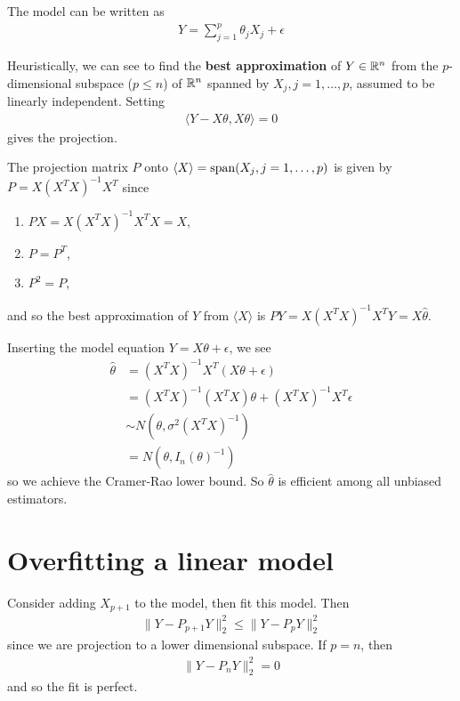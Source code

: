 \begin{proposition}
  The model can be written as
  \begin{align}
    \label{eq:100}
    Y = \sum_{j=1}^{p} \theta_{j} X_{j} + \epsilon
  \end{align}

  Heuristically, we can see to find the \textbf{best approximation} of
  $Y \in \mathbb{R}^{n}$ from the $p$-dimensional subspace ($p \leq n$) of
  $\mathbb{R}^{n}$ spanned by $X_{j}, j = 1, \dots, p$, assumed to be linearly
  independent.  Setting
  \begin{align}
    \label{eq:100}
    \langle Y - X \theta, X\theta \rangle = 0
  \end{align} gives the projection.

  The projection matrix $P$ onto $\langle X \rangle = \operatorname*{span} (X_{j}, j
  = 1, \dots, p)$ is given by $P = X (X^{T} X)^{-1} X^{T}$ since
  \begin{enumerate}
  \item $PX = X (X^{T} X)^{-1} X^{T} X = X$,
  \item $P = P^{T}$,
  \item $P^{2} = P$,
  \end{enumerate} and so the best approximation of $Y$ from $\langle X
  \rangle$ is $PY = X (X^{T} X)^{-1} X^{T} Y = X \hat \theta$.

  Inserting the model equation $Y = X \theta + \epsilon$, we see
  \begin{align}
    \label{eq:100}
    \hat \theta &= (X^{T} X)^{-1} X^{T} (X \theta + \epsilon) \\
    &= (X^{T} X)^{-1} (X^{T} X) \theta + (X^{T} X)^{-1} X^{T} \epsilon  \\
    &\sim N(\theta, \sigma^{2} (X^{T} X)^{-1}) \\
    &= N(\theta, I_{n}(\theta)^{-1})
  \end{align} so we achieve the Cramer-Rao lower bound.  So $\hat
  \theta$ is efficient among all unbiased estimators.
\end{proposition}

\section{Overfitting a linear model}
\label{sec:overf-line-model}

Consider adding $X_{p+1}$ to the model, then fit this model.  Then
\begin{align}
  \label{eq:100}
  \| Y - P_{p+1}Y \|_{2}^{2} \leq \| Y - P_{p} Y \|_{2}^{2}
\end{align} since we are projection to a lower dimensional subspace.
If $p = n$, then
\begin{align}
  \label{eq:100}
  \|Y - P_{n} Y \|_{2}^{2} = 0
\end{align} and so the fit is perfect.

